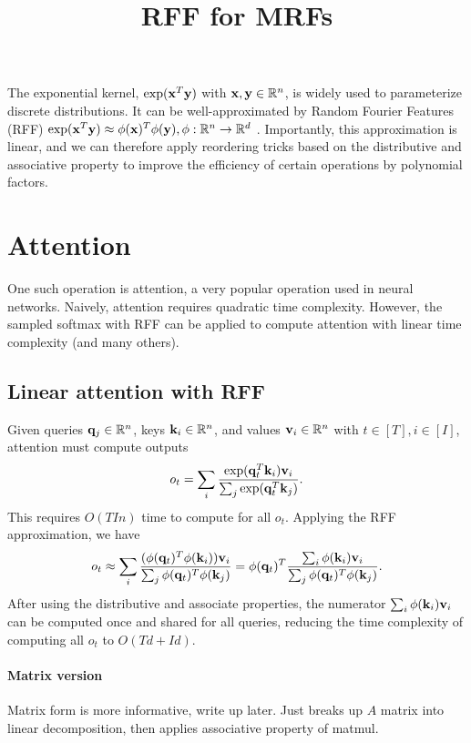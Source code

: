 \documentclass{article}
\title{RFF for MRFs}
\begin{document}
\maketitle

The exponential kernel, $\exp(\mathbf{x}^T\mathbf{y})$ with $\mathbf{x},\mathbf{y}\in\mathbb{R}^n$,
is widely used to parameterize discrete distributions.
It can be well-approximated by Random Fourier Features
(RFF) $\exp(\mathbf{x}^T\mathbf{y})\approx \phi(\mathbf{x})^T\phi(\mathbf{y}), \phi:\mathbb{R}^n\to\mathbb{R}^d$
\citep{rawat2019linearizedsoftmax}.
Importantly, this approximation is linear, and we can therefore apply
reordering tricks based on the distributive and associative property
to improve the efficiency of certain operations by polynomial factors.

\section{Attention}
One such operation is attention, a very popular operation used in neural networks.
Naively, attention requires quadratic time complexity.
However, the sampled softmax with RFF \citep{rawat2019linearizedsoftmax}
can be applied to compute attention with linear time complexity
\citep{choromanski2020rethinking} (and many others).

\subsection{Linear attention with RFF}
Given queries $\mathbf{q}_j\in\mathbb{R}^n$, keys $\mathbf{k}_i\in\mathbb{R}^n$, and values $\mathbf{v}_i\in\mathbb{R}^n$ with $t\in[T],i\in[I]$,
attention must compute outputs
\begin{equation}
o_t = \sum_i \frac{\exp(\mathbf{q}_t^T\mathbf{k}_i)\mathbf{v}_i}{\sum_j \exp(\mathbf{q}_t^T\mathbf{k}_j)}.
\end{equation}
This requires $O(TIn)$ time to compute for all $o_t$.
Applying the RFF approximation, we have
\begin{equation}
o_t \approx \sum_i \frac{(\phi(\mathbf{q}_t)^T\phi(\mathbf{k}_i))\mathbf{v}_i}{\sum_j \phi(\mathbf{q}_t)^T\phi(\mathbf{k}_j)}
= \phi(\mathbf{q}_t)^T \frac{\sum_i\phi(\mathbf{k}_i)\mathbf{v}_i}{\sum_j \phi(\mathbf{q}_t)^T\phi(\mathbf{k}_j)}.
\end{equation}
After using the distributive and associate properties, the numerator $\sum_i\phi(\mathbf{k}_i)\mathbf{v}_i$
can be computed once and shared for all queries, reducing the time complexity
of computing all $o_t$ to $O(Td+Id)$.

\paragraph{Matrix version}
Matrix form \citep{choromanski2020rethinking} is more informative, write up later.
Just breaks up $A$ matrix into linear decomposition,
then applies associative property of matmul.
\end{document}
